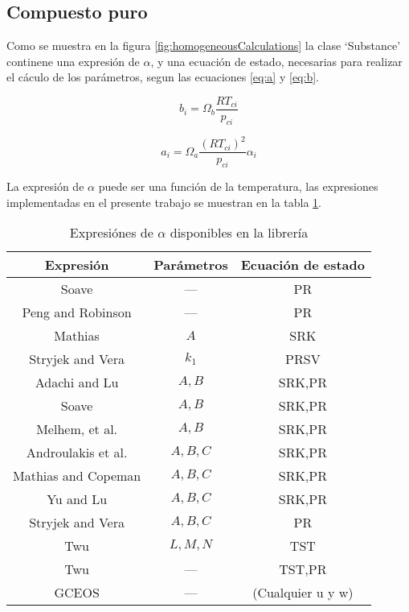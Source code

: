 \subsection{Compuesto puro}

Como se muestra en la figura \ref{fig:homogeneousCalculations} la clase `Substance' continene una expresión de $\alpha$, y una ecuación de estado, necesarias para realizar el cáculo de los parámetros, segun las ecuaciones \ref{eq:a} y \ref{eq:b}. 

\begin{equation}\label{eq:a}
	b_i = \Omega_b \frac{R T_{ci}}{p_{ci}} 
\end{equation}

\begin{equation}\label{eq:b}
 a_i = \Omega_a \frac{\left(R T_{ci}\right)^2}{p_{ci}} \alpha_i
\end{equation}

La expresión de $\alpha$ puede ser una función de la temperatura, las expresiones implementadas en el presente trabajo se muestran en la tabla \ref{tab:alphas}.

\begin{table}
\centering
\begin{tabular}{|c |c|c| }
	\hline
	Expresión & Parámetros & Ecuación de estado\\
	\hline
	Soave    &  ---& PR\\
	Peng and Robinson & ---& PR \\
	Mathias & $A$ & SRK\\
	Stryjek and Vera & $k_1$ & PRSV\\
	Adachi and Lu & $A,B$&SRK,PR\\
	Soave & $A,B$&SRK,PR\\
	Melhem, et al. & $A,B$&SRK,PR\\
	Androulakis et al. & $A,B,C$& SRK,PR\\
	Mathias and Copeman & $A,B,C$& SRK,PR\\
	Yu and Lu & $A,B,C$&SRK,PR\\
	Stryjek and Vera & $A,B,C$&PR\\
	Twu & $L,M,N$&TST\\
	Twu & ---&TST,PR\\
	GCEOS & ---& (Cualquier u y w)\\
	\hline
\end{tabular}
\caption{Expresiónes de $\alpha$ disponibles en la librería}\label{tab:alphas}
\end{table}



